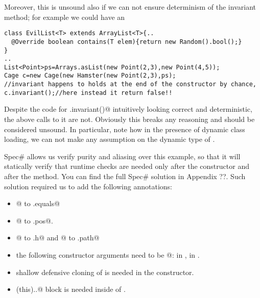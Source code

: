 Moreover, this is unsound also if we can not ensure determinism of the invariant method;
for example we could have an \Q@EvilList@

\begin{lstlisting}
class EvilList<T> extends ArrayList<T>{..
  @Override boolean contains(T elem){return new Random().bool();}
}
..
List<Point>ps=Arrays.asList(new Point(2,3),new Point(4,5));
Cage c=new Cage(new Hamster(new Point(2,3),ps);
//invariant happens to holds at the end of the constructor by chance,
c.invariant();//here instead it return false!!
\end{lstlisting}

Despite the code for \Q@Cage.invariant()@ intuitively looking correct and deterministic, the above calls to it are not. Obviously this breaks any reasoning and should be considered unsound. 
In particular, note how in the presence of dynamic class loading, 
we can not make any assumption on the dynamic type of \Q@path@.

Spec\# allows us verify purity and aliasing over this example, so that
it will statically verify that runtime checks are needed only
after the constructor and after the \Q@move@ method.
You can find the
full Spec\# solution in Appendix ??. Such solution required us to add
the following annotations:
\begin{itemize}
\item {}@ to \Q@Point.equals@
\item \Q@[Peer]@ to \Q@Hamster.pos@.
\item \Q@[Rep]@ to \Q@Cage.h@ and @ to \Q@Cage.path@
\item the following constructor arguments need to be \Q@[Captured]@:
\Q@Point@ in \Q@Hamster@, \Q@Hamster@ in \Q@Cage@.
\item shallow defensive cloning of \Q@path@ is needed in the \Q@Cage@ constructor.
\item\Q@expose(this){..}@ block is needed inside of \Q@move@.
\end{itemize}

